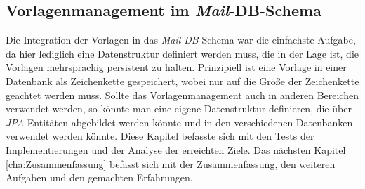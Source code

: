 \subsection{Vorlagenmanagement im \emph{Mail}-DB-Schema}
Die Integration der Vorlagen in das \emph{Mail-DB}-Schema war die einfachste Aufgabe, da hier lediglich eine Datenstruktur definiert werden muss, die in der Lage ist, die Vorlagen mehrsprachig persistent zu halten. Prinzipiell ist eine Vorlage in einer Datenbank als Zeichenkette gespeichert, wobei nur auf die Größe der Zeichenkette geachtet werden muss. Sollte das Vorlagenmanagement auch in anderen Bereichen verwendet werden, so könnte man eine eigene Datenstruktur definieren, die über \emph{JPA}-Entitäten abgebildet werden könnte und in den verschiedenen Datenbanken verwendet werden könnte.
\newline
\newline
Diese Kapitel befasste sich mit den Tests der Implementierungen und der Analyse der erreichten Ziele. Das nächsten Kapitel \ref{cha:Zusammenfassung} befasst sich mit der Zusammenfassung, den weiteren Aufgaben und den gemachten Erfahrungen.
